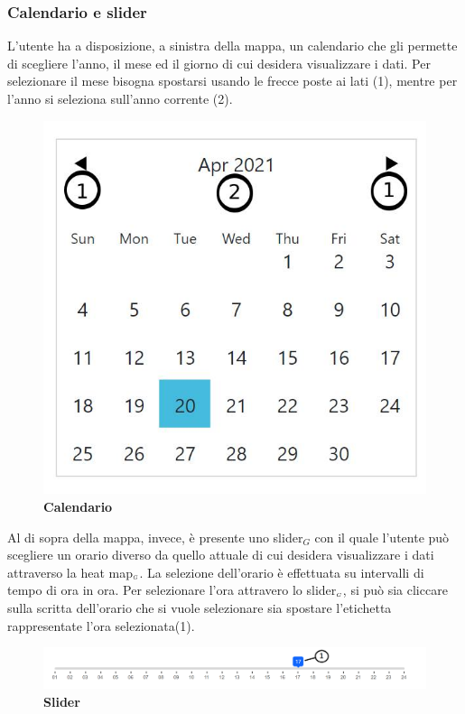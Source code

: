 \subsubsection{Calendario e slider}\label{UtilizzoDiGDPGatheringDetecionPlatformContenutoCentralePaginaInizialeHomeCalendarioESlider}
L'utente ha a disposizione, a sinistra della mappa, un calendario che gli permette di scegliere l'anno, il mese ed il giorno di cui desidera visualizzare i dati. Per selezionare il mese bisogna spostarsi usando le frecce poste ai lati (1), mentre per l'anno si seleziona sull'anno corrente (2).
\begin{center}
	\begin{figure}[H]
		\centering\includegraphics[width=0.3\linewidth]{../immagini/manualeUtente/Calendario.jpg}
		\caption{\textbf{Calendario}}
	\end{figure}
\end{center}
Al di sopra della mappa, invece, è presente uno slider$_G$ con il quale l'utente può scegliere un orario diverso da quello attuale di cui desidera visualizzare i dati attraverso la heat map$_{\scaleto{G}{3pt}}$. La selezione dell'orario è effettuata su intervalli di tempo di ora in ora. Per selezionare l'ora attravero lo slider$_{\scaleto{G}{3pt}}$, si può sia cliccare sulla scritta dell'orario che si vuole selezionare sia spostare l'etichetta rappresentate l'ora selezionata(1).
\begin{center}
	\begin{figure}[H]
		\centering\includegraphics[width=1\linewidth]{../immagini/manualeUtente/Slider.png}
		\caption{\textbf{Slider}}
	\end{figure}
\end{center}

